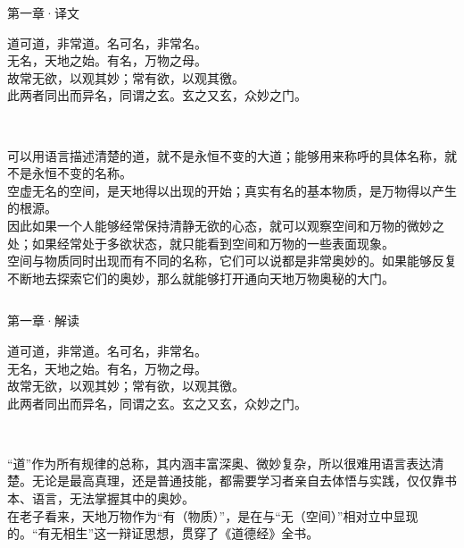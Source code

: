 \documentclass{beamer}
\newcommand{\classical}[1]{\textcolor{classical}{\kaishu #1}}         %
\newcommand{\trans}[1]{\textcolor{trans}{\fangsong #1}}              %
\newcommand{\comment}[1]{\textcolor{comment}{\kaishu #1}}            %
\newcommand{\originaltext}[1]{
	\begin{center}
		\large\classical{#1}
	\end{center}
	}
\begin{document}
\begin{frame}{第一章·译文}
	\originaltext{
	道可道，非常道。名可名，非常名。\\
	无名，天地之始。有名，万物之母。\\
	故常无欲，以观其妙；常有欲，以观其徼。\\
	此两者同出而异名，同谓之玄。玄之又玄，众妙之门。
	}
	\begin{columns}[T]
		\trans{\setlength{\parindent}{2em}\\
		可以用语言描述清楚的道，就不是永恒不变的大道；能够用来称呼的具体名称，就不是永恒不变的名称。\\
		空虚无名的空间，是天地得以出现的开始；真实有名的基本物质，是万物得以产生的根源。\\
		因此如果一个人能够经常保持清静无欲的心态，就可以观察空间和万物的微妙之处；如果经常处于多欲状态，就只能看到空间和万物的一些表面现象。\\
		空间与物质同时出现而有不同的名称，它们可以说都是非常奥妙的。如果能够反复不断地去探索它们的奥妙，那么就能够打开通向天地万物奥秘的大门。
		}
		
	\end{columns}
\end{frame}

\begin{frame}{第一章·解读}
	\originaltext{
	道可道，非常道。名可名，非常名。\\
	无名，天地之始。有名，万物之母。\\
	故常无欲，以观其妙；常有欲，以观其徼。\\
	此两者同出而异名，同谓之玄。玄之又玄，众妙之门。
	}
	\begin{columns}[T]
		\column{1.0\textwidth}
		\comment{\setlength{\parindent}{2em}\\
		“道”作为所有规律的总称，其内涵丰富深奥、微妙复杂，所以很难用语言表达清楚。无论是最高真理，还是普通技能，都需要学习者亲自去体悟与实践，仅仅靠书本、语言，无法掌握其中的奥妙。\\
		在老子看来，天地万物作为“有（物质）”，是在与“无（空间）”相对立中显现的。“有无相生”这一辩证思想，贯穿了《道德经》全书。
		}
	\end{columns}
\end{frame}

\end{document}
